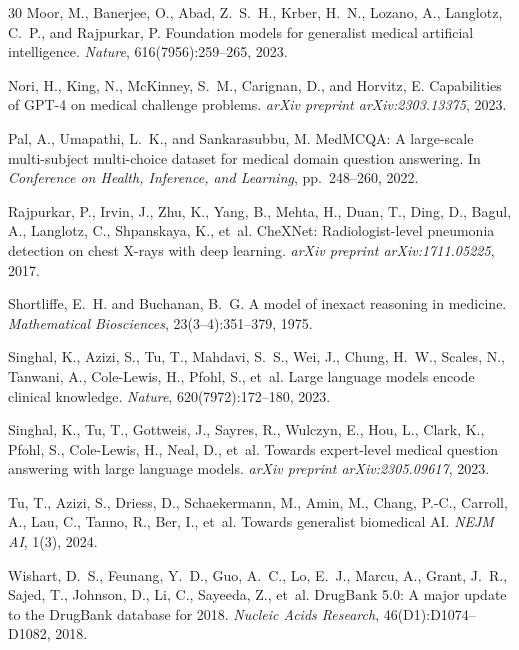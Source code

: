 \documentclass[11pt,a4paper]{article}
\begin{document}
\begin{thebibliography}{30}
Moor, M., Banerjee, O., Abad, Z.~S.~H., Krber, H.~N., Lozano, A., Langlotz, C.~P., and Rajpurkar, P.
\newblock Foundation models for generalist medical artificial intelligence.
\newblock \emph{Nature}, 616(7956):259--265, 2023.

Nori, H., King, N., McKinney, S.~M., Carignan, D., and Horvitz, E.
\newblock Capabilities of GPT-4 on medical challenge problems.
\newblock \emph{arXiv preprint arXiv:2303.13375}, 2023.

Pal, A., Umapathi, L.~K., and Sankarasubbu, M.
\newblock MedMCQA: A large-scale multi-subject multi-choice dataset for medical domain question answering.
\newblock In \emph{Conference on Health, Inference, and Learning}, pp.\ 248--260, 2022.

Rajpurkar, P., Irvin, J., Zhu, K., Yang, B., Mehta, H., Duan, T., Ding, D., Bagul, A., Langlotz, C., Shpanskaya, K., et~al.
\newblock CheXNet: Radiologist-level pneumonia detection on chest X-rays with deep learning.
\newblock \emph{arXiv preprint arXiv:1711.05225}, 2017.

Shortliffe, E.~H. and Buchanan, B.~G.
\newblock A model of inexact reasoning in medicine.
\newblock \emph{Mathematical Biosciences}, 23(3--4):351--379, 1975.

Singhal, K., Azizi, S., Tu, T., Mahdavi, S.~S., Wei, J., Chung, H.~W., Scales, N., Tanwani, A., Cole-Lewis, H., Pfohl, S., et~al.
\newblock Large language models encode clinical knowledge.
\newblock \emph{Nature}, 620(7972):172--180, 2023.

Singhal, K., Tu, T., Gottweis, J., Sayres, R., Wulczyn, E., Hou, L., Clark, K., Pfohl, S., Cole-Lewis, H., Neal, D., et~al.
\newblock Towards expert-level medical question answering with large language models.
\newblock \emph{arXiv preprint arXiv:2305.09617}, 2023.

Tu, T., Azizi, S., Driess, D., Schaekermann, M., Amin, M., Chang, P.-C., Carroll, A., Lau, C., Tanno, R., Ber, I., et~al.
\newblock Towards generalist biomedical AI.
\newblock \emph{NEJM AI}, 1(3), 2024.

Wishart, D.~S., Feunang, Y.~D., Guo, A.~C., Lo, E.~J., Marcu, A., Grant, J.~R., Sajed, T., Johnson, D., Li, C., Sayeeda, Z., et~al.
\newblock DrugBank 5.0: A major update to the DrugBank database for 2018.
\newblock \emph{Nucleic Acids Research}, 46(D1):D1074--D1082, 2018.


\end{thebibliography}
\end{document}
